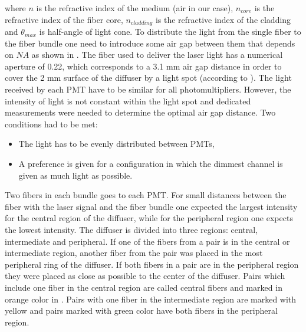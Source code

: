 where $n$ is the refractive index of the medium (air in our case), $n_{core}$ is the refractive index of the fiber core, $n_{cladding}$ is the refractive index 
of the cladding and $\theta_{max}$ is half-angle of light cone. 
To distribute the light from the single fiber to the fiber bundle one need to introduce some air gap between them that depends on $NA$ 
as shown in .
The fiber used to deliver the laser light has a numerical aperture of 0.22, which corresponds to a 3.1 mm air gap distance 
in order to cover the 2 mm surface of the diffuser by a light spot (according to ).
The light received by each PMT have to be similar for all photomultipliers.
However, the intensity of light is not constant within the light spot and dedicated measurements were needed to determine the optimal air gap distance.
Two conditions had to be met:
\begin{itemize}
 \item The light has to be evenly distributed between PMTs,
 \item A preference is given for a configuration in which the dimmest channel is given as much light as possible.
\end{itemize}
Two fibers in each bundle goes to each PMT. 
For small distances between the fiber with the laser signal and the fiber bundle one expected the largest intensity for the central 
region of the diffuser, while for the peripheral region one expects the lowest intensity.
The diffuser is divided into three regions: central, intermediate and peripheral. 
If one of the fibers from a pair is in the central or intermediate region, another fiber from the pair was placed in the most peripheral ring of the diffuser.
If both fibers in a pair are in the peripheral region they were placed as close as possible to the center of the diffuser.
Pairs which include one fiber in the central region are called central fibers and marked in orange color in .
Pairs with one fiber in the intermediate region are marked with yellow and pairs marked with green color have both fibers in the peripheral region.

